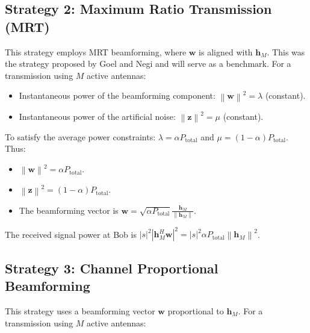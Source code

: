 \documentclass[10pt,a4paper]{article} %
\newcommand{\norm}[1]{\left\| #1 \right\|}
\newcommand{\herm}{^H} %
\begin{document}
\subsection{Strategy 2: Maximum Ratio Transmission (MRT)}
This strategy employs MRT beamforming, where $\mathbf{w}$ is aligned with $\mathbf{h}_M$. This was the strategy proposed by Goel and Negi and will serve as a benchmark. For a transmission using $M$ active antennas:
\begin{itemize}
    \item Instantaneous power of the beamforming component: $\norm{\mathbf{w}}^2 = \lambda$ (constant).
    \item Instantaneous power of the artificial noise: $\norm{\mathbf{z}}^2 = \mu$ (constant).
\end{itemize}
To satisfy the average power constraints:
$\lambda = \alpha P_{\text{total}}$ and $\mu = (1-\alpha)P_{\text{total}}$.
Thus:
\begin{itemize}
    \item $\norm{\mathbf{w}}^2 = \alpha P_{\text{total}}$.
    \item $\norm{\mathbf{z}}^2 = (1-\alpha)P_{\text{total}}$.
    \item The beamforming vector is $\mathbf{w} = \sqrt{\alpha P_{\text{total}}} \frac{\mathbf{h}_M}{\norm{\mathbf{h}_M}}$.
\end{itemize}
The received signal power at Bob is $|s|^2|\mathbf{h}_M\herm \mathbf{w}|^2 = |s|^2 \alpha P_{\text{total}} \norm{\mathbf{h}_M}^2$.

\subsection{Strategy 3: Channel Proportional Beamforming}
This strategy uses a beamforming vector $\mathbf{w}$ proportional to $\mathbf{h}_M$. For a transmission using $M$ active antennas:
\end{document}
